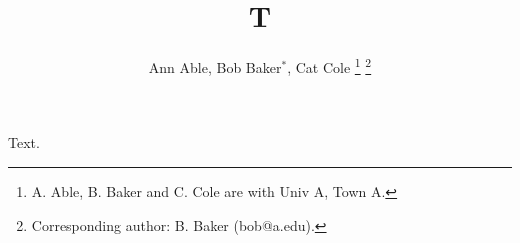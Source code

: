 \documentclass[journal]{IEEEtran}
\begin{document}
\title{T}
\author{Ann Able, Bob Baker$^{\ast}$, Cat Cole
\thanks{A. Able, B. Baker and C. Cole are with Univ A, Town A.}
\thanks{Corresponding author: B. Baker (bob@a.edu).}}
\maketitle
Text.
\end{document}
